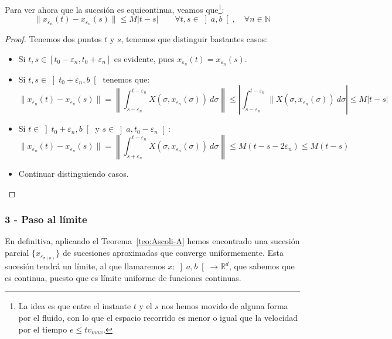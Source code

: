 \noindent
Para ver ahora que la sucesión es equicontinua, veamos que\footnote{La idea es que entre el instante $t$ y el $s$ nos hemos movido de alguna forma por el fluido, con lo que el espacio recorrido es menor o igual que la velocidad por el tiempo $e\leq tv_{max}$.}:
\begin{equation*}
    \|x_{\varepsilon_n}(t) - x_{\varepsilon_n}(s)\| \leq M|t-s| \qquad \forall t,s\in \left]a,b\right[, \quad \forall n\in \mathbb{N}
\end{equation*}
\begin{proof}
    Tenemos dos puntos $t$ y $s$, tenemos que distinguir bastantes casos:
    \begin{itemize}
        \item Si $t,s\in [t_0-\varepsilon_n,t_0+\varepsilon_n]$ es evidente, pues $x_{\varepsilon_n}(t) = x_{\varepsilon_n}(s)$.
        \item Si $t,s\in \left]t_0+\varepsilon_n,b\right[$ tenemos que:
            \begin{equation*}
                \|x_{\varepsilon_n}(t) - x_{\varepsilon_n}(s)\| = \left\|\int_{s-\varepsilon_n}^{t-\varepsilon_n} X(\sigma,x_{\varepsilon_n}(\sigma))~d\sigma \right\| \leq \left|\int_{s-\varepsilon_n}^{t-\varepsilon_n} \|X(\sigma,x_{\varepsilon_n}(\sigma))~d\sigma \right| \leq M|t-s|
            \end{equation*}
        \item Si $t\in \left]t_0+\varepsilon_n,b\right[$ y $s\in \left]a,t_0-\varepsilon_n\right[$:
            \begin{equation*}
                \|x_{\varepsilon_n}(t) - x_{\varepsilon_n}(s)\| = \left\|\int_{s+\varepsilon_n}^{t-\varepsilon_n} X(\sigma,x_{\varepsilon_n}(\sigma))~d\sigma \right\| \leq M(t-s-2\varepsilon_n) \leq M(t-s)
            \end{equation*}
        \item Continuar distinguiendo casos. %
    \end{itemize}
\end{proof}

\subsubsection{3 - Paso al límite}
\noindent
En definitiva, aplicando el Teorema~\ref{teo:Ascoli-A} hemos encontrado una sucesión parcial $\{x_{\varepsilon_{\sigma(n)}}\}$ de sucesiones aproximadas que converge uniformemente. Esta sucesión tendrá un límite, al que llamaremos $x:\left]a,b\right[\to \mathbb{R}^d$, que sabemos que es continua, puesto que es límite uniforme de funciones continuas.\\

